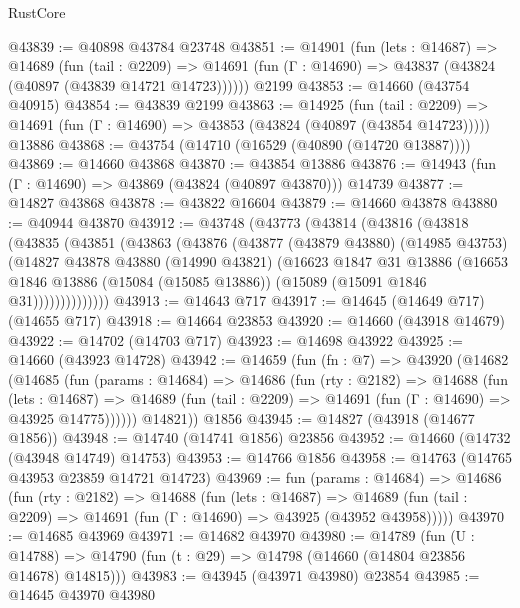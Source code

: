\begin{lexlean}{RustCore}
\begin{coremodule}
@43839 := @40898 @43784 @23748
@43851 := @14901
    (fun (lets : @14687) =>
    @14689
      (fun (tail : @2209) =>
      @14691 (fun (Γ : @14690) => @43837 (@43824 (@40897 (@43839 @14721 @14723))))))
    @2199
@43853 := @14660 (@43754 @40915)
@43854 := @43839 @2199
@43863 := @14925
    (fun (tail : @2209) => @14691 (fun (Γ : @14690) => @43853 (@43824 (@40897 (@43854 @14723)))))
    @13886
@43868 := @43754 (@14710 (@16529 (@40890 (@14720 @13887))))
@43869 := @14660 @43868
@43870 := @43854 @13886
@43876 := @14943 (fun (Γ : @14690) => @43869 (@43824 (@40897 @43870))) @14739
@43877 := @14827 @43868
@43878 := @43822 @16604
@43879 := @14660 @43878
@43880 := @40944 @43870
@43912 := @43748
    (@43773
      (@43814
        (@43816
          (@43818
            (@43835
              (@43851
                (@43863
                  (@43876
                    (@43877
                      (@43879 @43880)
                      (@14985 @43753)
                      (@14827
                        @43878
                        @43880
                        (@14990 @43821)
                        (@16623
                          @1847
                          @31
                          @13886
                          (@16653
                            @1846
                            @13886
                            (@15084 (@15085 @13886))
                            (@15089 (@15091 @1846 @31))))))))))))))
@43913 := @14643 @717
@43917 := @14645 (@14649 @717) (@14655 @717)
@43918 := @14664 @23853
@43920 := @14660 (@43918 @14679)
@43922 := @14702 (@14703 @717)
@43923 := @14698 @43922
@43925 := @14660 (@43923 @14728)
@43942 := @14659
    (fun (fn : @7) =>
    @43920
      (@14682
        (@14685
          (fun (params : @14684) =>
          @14686
            (fun (rty : @2182) =>
            @14688
              (fun (lets : @14687) =>
              @14689 (fun (tail : @2209) => @14691 (fun (Γ : @14690) => @43925 @14775))))))
        @14821))
    @1856
@43945 := @14827 (@43918 (@14677 @1856))
@43948 := @14740 (@14741 @1856) @23856
@43952 := @14660 (@14732 (@43948 @14749) @14753)
@43953 := @14766 @1856
@43958 := @14763 (@14765 @43953 @23859 @14721 @14723)
@43969 := fun (params : @14684) =>
  @14686
    (fun (rty : @2182) =>
    @14688
      (fun (lets : @14687) =>
      @14689 (fun (tail : @2209) => @14691 (fun (Γ : @14690) => @43925 (@43952 @43958)))))
@43970 := @14685 @43969
@43971 := @14682 @43970
@43980 := @14789
    (fun (U : @14788) => @14790 (fun (t : @29) => @14798 (@14660 (@14804 @23856 @14678) @14815)))
@43983 := @43945 (@43971 @43980) @23854
@43985 := @14645 @43970 @43980

\end{coremodule}
\end{lexlean}
